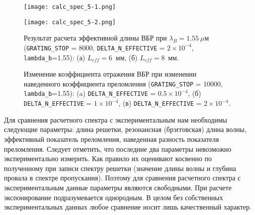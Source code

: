 \begin{figure}
\centering
\texttt{[image: calc\_spec\_5-1.png]}
\end{figure}
\begin{figure}
\centering
\texttt{[image: calc\_spec\_5-2.png]}
\caption{Результат расчета эффективной длины ВБР при $\lambda_B=1.55~\mu$м (\texttt{GRATING\_STOP} = 8000, \texttt{DELTA\_N\_EFFECTIVE} = $2\times {10}^{-4}$, \texttt{lambda\_b}=1.55): (а) $L_{eff}=6$~мм,  (б) $L_{eff}=8$~мм.}
\label{fig:calc_spec_5}
\end{figure}
\begin{figure}
\begin{center}
\begin{minipage}[h]{0.47\linewidth}
\end{minipage}
\vfill
\begin{minipage}[h]{0.47\linewidth}
\end{minipage}
\vfill
\begin{minipage}[h]{0.47\linewidth}
\end{minipage}
\caption{Изменение коэффициента отражения ВБР при изменении наведенного коэффициента преломления (\texttt{GRATING\_STOP} = 10000, \texttt{lambda\_b}=1.55): (a) \texttt{DELTA\_N\_EFFECTIVE} = $0.5\times 10^{-4}$, (б) \texttt{DELTA\_N\_EFFECTIVE} = $1\times {10}^{-4}$, (в) \texttt{DELTA\_N\_EFFECTIVE} = $2\times {10}^{-4}$.}
\label{fig:calc_spec_6}
\end{center}
\end{figure}

Для сравнения расчетного спектра с экспериментальным нам необходимы следующие параметры: длина решетки, резонансная (брэгговская) длина волны, эффективный показатель преломления, наведенная разность показателя преломления. Следует отметить, что последние два параметры невозможно экспериментально измерить. Как правило их оценивают косвенно по полученному при записи спектру решетки (значение длины волны и глубина провала в спектре пропускания). Поэтому для сравнения расчетного спектра с экспериментальным данные параметры являются свободными. При расчете экспонирование подразумевается однородным. В целом без собственных экспериментальных данных любое сравнение носит лишь качественный характер.

